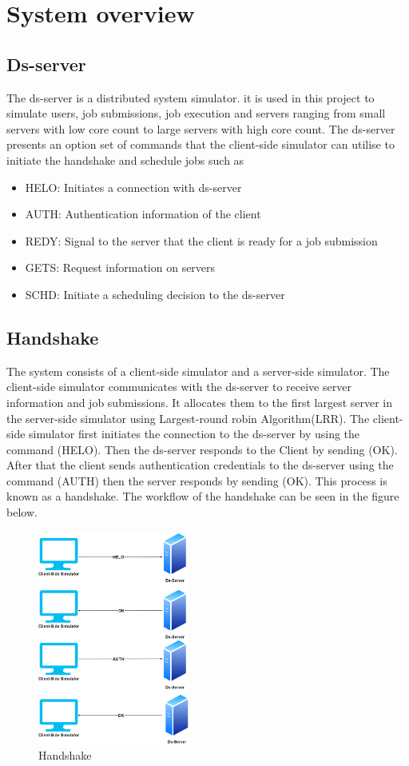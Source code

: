 \documentclass[a4paper]{article} %
\begin{document}
\section{System overview}
\subsection{Ds-server}
The ds-server is a distributed system simulator\cite{Dsimgithub}. it is used in this project to simulate users, job submissions, job execution and servers ranging from small servers with low core count to large servers with high core count. The ds-server presents an option set of commands that the client-side simulator can utilise to initiate the handshake and schedule jobs such as
\begin{itemize}
    \item HELO: Initiates a connection with ds-server
    \item AUTH: Authentication information of the client 
    \item REDY: Signal to the server that the client is ready for a job submission
    \item GETS: Request information on servers
    \item SCHD: Initiate a scheduling decision to the ds-server 
\end{itemize}

\subsection{Handshake}
The system consists of a client-side simulator and a server-side simulator. The client-side simulator communicates with the ds-server to receive server information and job submissions. It allocates them to the first largest server in the server-side simulator using Largest-round robin Algorithm(LRR). The client-side simulator first initiates the connection to the ds-server by using the command (HELO). Then the ds-server responds to the Client by sending (OK). After that the client sends authentication credentials to the ds-server using the command (AUTH) then the server responds by sending (OK). This process is known as a handshake. The workflow of the handshake can be seen in the figure below.
\begin{figure}[!htb]
    \centering
    \includegraphics[width = 50mm,scale=1]{Handshake.png}
    \caption{Handshake}
    \label{Handshake}
\end{figure}
\end{document}
